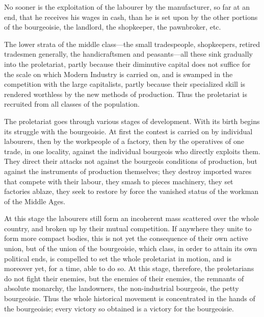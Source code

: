No sooner is the exploitation of the labourer by the manufacturer, so
far at an end, that he receives his wages in cash, than he is set upon
by the other portions of the bourgeoisie, the landlord, the shopkeeper,
the pawnbroker, etc.

The lower strata of the middle class—the small tradespeople,
shopkeepers, retired tradesmen generally, the handicraftsmen and
peasants—all these sink gradually into the proletariat, partly because
their diminutive capital does not suffice for the scale on which Modern
Industry is carried on, and is swamped in the competition with the
large capitalists, partly because their specialized skill is rendered
worthless by the new methods of production. Thus the proletariat is
recruited from all classes of the population.

The proletariat goes through various stages of development. With its
birth begins its struggle with the bourgeoisie. At first the contest is
carried on by individual labourers, then by the workpeople of a
factory, then by the operatives of one trade, in one locality, against
the individual bourgeois who directly exploits them. They direct their
attacks not against the bourgeois conditions of production, but against
the instruments of production themselves; they destroy imported wares
that compete with their labour, they smash to pieces machinery, they
set factories ablaze, they seek to restore by force the vanished status
of the workman of the Middle Ages.

At this stage the labourers still form an incoherent mass scattered
over the whole country, and broken up by their mutual competition. If
anywhere they unite to form more compact bodies, this is not yet the
consequence of their own active union, but of the union of the
bourgeoisie, which class, in order to attain its own political ends, is
compelled to set the whole proletariat in motion, and is moreover yet,
for a time, able to do so. At this stage, therefore, the proletarians
do not fight their enemies, but the enemies of their enemies, the
remnants of absolute monarchy, the landowners, the non-industrial
bourgeois, the petty bourgeoisie. Thus the whole historical movement is
concentrated in the hands of the bourgeoisie; every victory so obtained
is a victory for the bourgeoisie.

